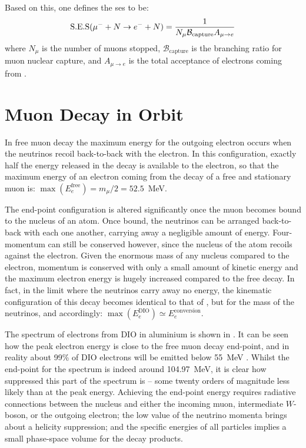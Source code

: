 Based on this, one defines the \acf{ses} to be:
\begin{equation}
	\eqlabel{det:ses}
\mathrm{S.E.S}(\muec)=\frac{1}{N_\mu \mathcal{B}_\mathrm{capture} A_{\mu\rightarrow e}}
\end{equation}
where $N_\mu$ is the number of muons stopped, $\mathcal{B}_\mathrm{capture}$ is the branching ratio for muon nuclear capture, and $A_{\mu\rightarrow e}$ is the total acceptance of electrons coming from \mueconv.

\section{Muon Decay in Orbit}
In free muon decay the maximum energy for the outgoing electron occurs when the neutrinos recoil back-to-back with the electron.
In this configuration, exactly half the energy released in the decay is available to the electron, so that the maximum energy of an electron coming from the decay of a free and stationary muon is: $\max(E_{e}^\textrm{free})=m_\mu/2=52.5$~MeV.

The end-point configuration is altered significantly once the muon becomes bound to the nucleus of an atom.
Once bound, the neutrinos can be arranged back-to-back with each one another, carrying away a negligible amount of energy.
Four-momentum can still be conserved however, since the nucleus of the atom recoils against the electron.  
Given the enormous mass of any nucleus compared to the electron, momentum is conserved with only a small amount of kinetic energy and the maximum electron energy is hugely increased compared to the free decay.
In fact, in the limit where the neutrinos carry away no energy, the kinematic configuration of this decay becomes identical to that of \mueconv, but for the mass of the neutrinos, and accordingly: $\max(E_{e}^\textrm{DIO})\simeq{}E_{e}^\textrm{conversion}$.
\FigDecayInOrbitSpectrum

The spectrum of electrons from \ac{DIO} in aluminium is shown in .
It can be seen how the peak electron energy is close to the free muon decay end-point, and in reality about 99\% of \ac{DIO} electrons will be emitted below 55~MeV .
Whilst the end-point for the spectrum is indeed around 104.97~MeV, it is clear how suppressed this part of the spectrum is -- some twenty orders of magnitude less likely than at the peak energy.
Achieving the end-point energy requires radiative connections between the nucleus and either the incoming muon, intermediate $W$-boson, or the outgoing electron; the low value of the neutrino momenta brings about a helicity suppression; and the specific energies of all particles implies a small phase-space volume for the decay products.

